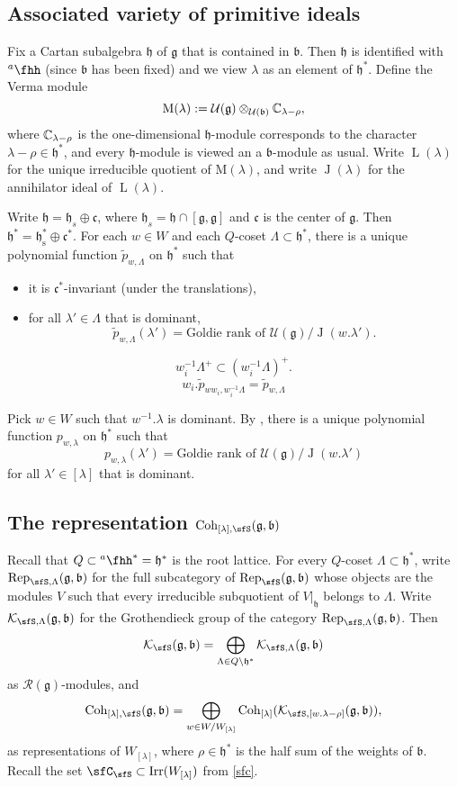 \documentclass[12pt,a4paper]{amsart}
\newcommand{\CK}{{\mathcal {K}}}
\newcommand{\CU}{{\mathcal {U}}}
\newcommand{\oL}{\operatorname{L}}
\newcommand{\oJ}{\operatorname{J}}
\newcommand{\g}{\mathfrak g}
\newcommand{\h}{\mathfrak h}
\renewcommand{\b}{\mathfrak b}
\renewcommand{\c}{\mathfrak c}
\numberwithin{equation}{section}
\theoremstyle{remark}
\def\Irr{\mathrm{Irr}}
\def\hha{{}^a\fhh}
\def\Coh{\mathrm{Coh}}
\newcommand{\Lam}{{[\lambda]}}
\begin{document}
\subsection{Associated variety of primitive ideals}
Fix a Cartan subalgebra $\h$ of $\g$ that is contained in $\b$. Then $\h$ is identified with $\hha$ (since $\b$ has been fixed) and we view $\lambda$ as an element of $\h^*$.
Define the Verma module
\[
  \mathrm M(\lambda):=\CU(\g)\otimes_{\CU(\b)} \C_{\lambda-\rho},
\]
where $\mathbb{C}_{\lambda-\rho}$ is the one-dimensional $\h$-module corresponds to the character $\lambda-\rho\in \h^*$, and every $\h$-module is viewed an a $\b$-module as usual.
Write
$\oL(\lambda)$ for the unique irreducible quotient of $ \mathrm M(\lambda)$, and write $\oJ(\lambda)$ for the annihilator ideal of $\oL(\lambda)$.

Write $\h=\h_s\oplus \c$, where $\h_s=\h\cap [\g,\g]$ and $\c$ is the center of $\g$. Then $\h^*=\h_\mathrm s^*\oplus \c^*$. For each $w\in W$ and each $Q$-coset $\Lambda\subset \h^*$, there is a unique
polynomial function $\tilde p_{w,\Lambda}$ on $\h^*$ such that
\begin{itemize}
\item it is $\c^*$-invariant (under the translations),
\item for all $\lambda'\in \Lambda$ that is dominant,
\[
 \tilde p_{w,\Lambda}(\lambda')=\textrm{Goldie rank of } \CU(\g)/\oJ(w.\lambda').
\]

\end{itemize}


\[
  w_i^{-1} \Lambda^+\subset(w_i^{-1}\Lambda)^+.
\]
\[
w_i. \tilde p_{ww_i, w_i^{-1}\Lambda}=\tilde p_{w,\Lambda}
\]


Pick  $w\in W$ such that $w^{-1}.\lambda$ is dominant. By \cite{Jos}, there is a unique polynomial function $p_{w,\lambda}$ on $\h^*$ such that
\[
  p_{w,\lambda}(\lambda')=\textrm{Goldie rank of } \CU(\g)/\oJ(w.\lambda')
\]
for all $\lambda'\in \Lam$ that is dominant.




\subsection{The representation $\Coh_{\Lam,\sfS}(\g,\b)$}
Recall that $Q\subset \hha^*=\h^*$ is the root lattice. For every $Q$-coset $\Lambda\subset \h^*$, write $\Rep_{\sfS,\Lambda}(\g,\b)$ for the full subcategory of $\Rep_\sfS(\g,\b)$ whose objects are  the modules $V$ such that every irreducible subquotient of $V|_\h$ belongs to $\Lambda$. Write $\CK_{\sfS,\Lambda}(\g,\b)$ for the  Grothendieck group of the category $\Rep_{\sfS,\Lambda}(\g,\b)$.  Then
\[
   \CK_{\sfS}(\g,\b)=\bigoplus_{\Lambda\in Q\backslash \h^*} \CK_{\sfS,\Lambda}(\g,\b)
\]
as $\mathcal R(\g)$-modules,
and
\[
\Coh_{\Lam,\sfS}(\g,\b) =\bigoplus_{w\in W/W_\Lam} \Coh_{\Lam}( \CK_{\sfS, [ w.\lambda -\rho]}(\g,\b)),
\]
as representations of $W_\Lam$, where $\rho\in \h^*$ is the half sum of the weights of $\b$. Recall the set
$  \sfC_{\sfS}\subset \Irr(W_\Lam)$ from \eqref{sfc}.
\end{document}
